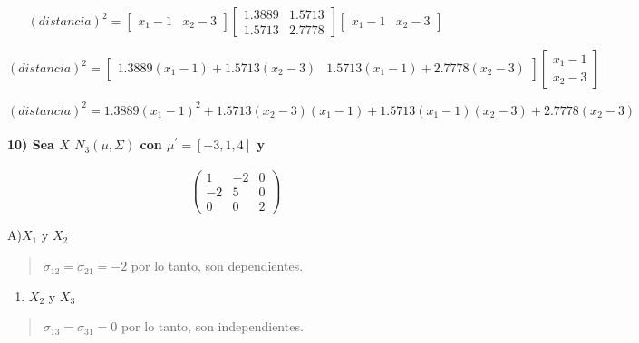 \documentclass[
]{article}
\providecommand{\tightlist}{%
  \setlength{\itemsep}{0pt}\setlength{\parskip}{0pt}}
\begin{document}
\[
(distancia)^2 = \begin{bmatrix}
x_{1}-1 & x_{2}-3
\end{bmatrix}  \begin{bmatrix}
1.3889 & 1.5713  \\
1.5713 & 2.7778
\end{bmatrix} \begin{bmatrix}
x_{1} -1 & x_{2}-3
\end{bmatrix}
\]

\[ 
(distancia)^2 = [\begin{array} {cc}
1.3889(x_1 -1) + 1.5713(x_2 -3) &  1.5713(x_1 -1)+2.7778(x_2 -3) \end{array} ]  \left[  \begin{array}{cc}
x_{1} -1 \\
x_{2}-3
\end{array} \right]
\]

\[
(distancia)^2 = 1.3889(x_1 -1)^2 + 1.5713(x_2 -3)(x_1 -1) + 1.5713(x_1 -1)(x_2 -3) + 2.7778(x_2 -3)
\]

\hypertarget{sea-x-n_3mu-sigma-con-mu--314-y}{%
\paragraph{\texorpdfstring{10) Sea \(X\) \(N_{3}(\mu, \Sigma)\) con
\(\mu^{'} = [-3,1,4]\)
y}{10) Sea X N\_\{3\}(\textbackslash mu, \textbackslash Sigma) con \textbackslash mu\^{}\{'\} = {[}-3,1,4{]} y}}\label{sea-x-n_3mu-sigma-con-mu--314-y}}

\[
\left(\begin{array} {cc} 
1 & -2 & 0\\
-2 & 5 & 0 \\
0 & 0 & 2
\end{array}\right)
\]

A)\(X_{1}\) y \(X_{2}\)

\begin{quote}
\(\sigma_{12} = \sigma_{21} = -2\) por lo tanto, son dependientes.
\end{quote}

\begin{enumerate}
\def\labelenumi{\Alph{enumi})}
\setcounter{enumi}{1}
\tightlist
\item
  \(X_{2}\) y \(X_{3}\)
\end{enumerate}

\begin{quote}
\(\sigma_{13} = \sigma_{31} = 0\) por lo tanto, son independientes.
\end{quote}
\end{document}

